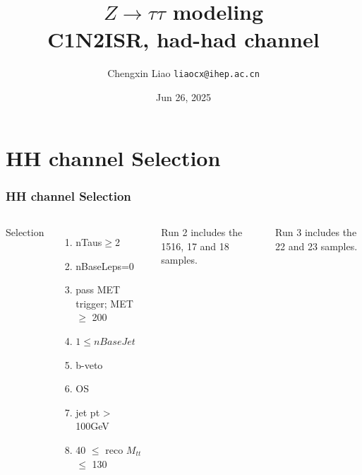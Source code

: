 \documentclass[usenames,dvipsnames]{beamer}
\title[$Z\rightarrow \tau\tau$ modeling C1N2ISR, had-had channel]{$Z\rightarrow \tau\tau$ modeling\\ C1N2ISR, had-had channel}
\date[Jun 26, 2025]{Jun 26, 2025}
\author[Chengxin Liao]{
  Chengxin Liao
  \pdfnewline
  \texttt{liaocx@ihep.ac.cn}
}
\institute{Department of Physics, Shandong University}
\begin{document}
\begin{frame}
\titlepage
\end{frame}


\section{HH channel Selection}
\begin{frame}

\frametitle{HH channel Selection}
\begin{columns}
    \raggedright
    Selection
	\begin{enumerate}[\textbullet]
    
    \item nTaus$\geq$2
    
    \item nBaseLeps=0
    
    \item pass MET trigger; MET$\geq$ 200
    
    \item $1\leq nBaseJet$
     
    \item b-veto
    
    \item OS
    
    \item jet pt > 100GeV
    
    \item 40 $\leq$ reco $M_{tt}$ $\leq$ 130
    
    \end{enumerate}
    \vskip 0.2cm
    
Run 2 includes the 1516, 17 and 18 samples.

Run 3 includes the 22 and 23 samples.
%    

%    
    

\end{columns}
\end{frame}
\end{document}
